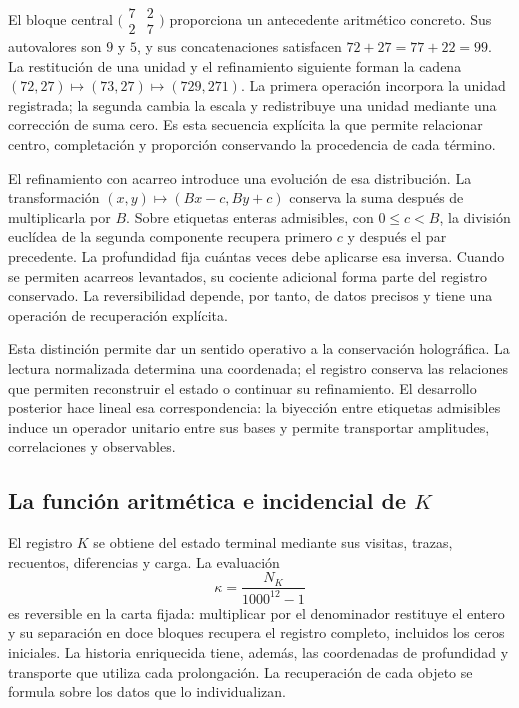 El bloque central \(\bigl(\begin{smallmatrix}7&2\\2&7\end{smallmatrix}\bigr)\) proporciona un antecedente aritmético concreto. Sus autovalores son \(9\) y \(5\), y sus concatenaciones satisfacen \(72+27=77+22=99\). La restitución de una unidad y el refinamiento siguiente forman la cadena \((72,27)\mapsto(73,27)\mapsto(729,271)\). La primera operación incorpora la unidad registrada; la segunda cambia la escala y redistribuye una unidad mediante una corrección de suma cero. Es esta secuencia explícita la que permite relacionar centro, completación y proporción conservando la procedencia de cada término.

El refinamiento con acarreo introduce una evolución de esa distribución. La transformación \((x,y)\mapsto(Bx-c,By+c)\) conserva la suma después de multiplicarla por \(B\). Sobre etiquetas enteras admisibles, con \(0\leq c<B\), la división euclídea de la segunda componente recupera primero \(c\) y después el par precedente. La profundidad fija cuántas veces debe aplicarse esa inversa. Cuando se permiten acarreos levantados, su cociente adicional forma parte del registro conservado. La reversibilidad depende, por tanto, de datos precisos y tiene una operación de recuperación explícita.

Esta distinción permite dar un sentido operativo a la conservación holográfica. La lectura normalizada determina una coordenada; el registro conserva las relaciones que permiten reconstruir el estado o continuar su refinamiento. El desarrollo posterior hace lineal esa correspondencia: la biyección entre etiquetas admisibles induce un operador unitario entre sus bases y permite transportar amplitudes, correlaciones y observables.

\subsection*{La función aritmética e incidencial de \(K\)}
El registro \(K\) se obtiene del estado terminal mediante sus visitas, trazas, recuentos, diferencias y carga. La evaluación
\[
\kappa=\frac{N_K}{1000^{12}-1}
\]
es reversible en la carta fijada: multiplicar por el denominador restituye el entero y su separación en doce bloques recupera el registro completo, incluidos los ceros iniciales. La historia enriquecida tiene, además, las coordenadas de profundidad y transporte que utiliza cada prolongación. La recuperación de cada objeto se formula sobre los datos que lo individualizan.

